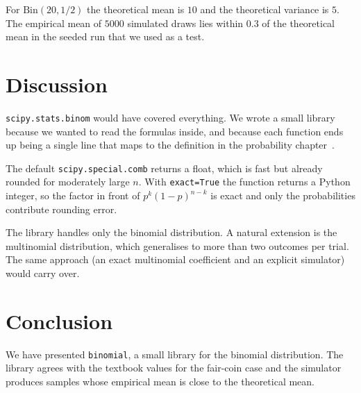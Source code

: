 \documentclass[11pt]{article}
\begin{document}
For \(\text{Bin}(20, 1/2)\) the theoretical mean is \(10\) and the
theoretical variance is \(5\). The empirical mean of \(5000\)
simulated draws lies within \(0.3\) of the theoretical mean in the
seeded run that we used as a test.

\section{Discussion}

\texttt{scipy.stats.binom} would have
covered everything. We wrote a small library because we wanted to
read the formulas inside, and because each function ends up being a
single line that maps to the definition in the probability
chapter~\cite{ross2014}.

The default
\texttt{scipy.special.comb} returns a float, which is fast but
already rounded for moderately large \(n\). With \texttt{exact=True}
the function returns a Python integer, so the factor in front of
\(p^k (1 - p)^{n - k}\) is exact and only the probabilities
contribute rounding error.

The library handles only the binomial
distribution. A natural extension is the multinomial distribution,
which generalises to more than two outcomes per trial. The same
approach (an exact multinomial coefficient and an explicit
simulator) would carry over.

\section{Conclusion}

We have presented \texttt{binomial}, a small library for the
binomial distribution. The library agrees with the textbook values
for the fair-coin case and the simulator produces samples whose
empirical mean is close to the theoretical mean.



\end{document}
